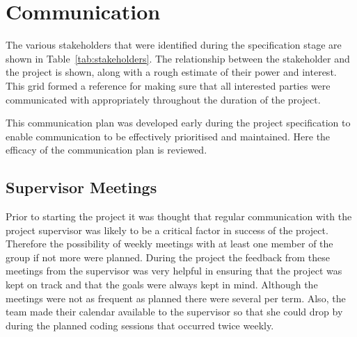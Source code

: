 \section{Communication}

The various stakeholders that were identified during the specification stage are shown in Table~\ref{tab:stakeholders}.
The relationship between the stakeholder and the project is shown, along with a rough
estimate of their power and interest.
This grid formed a reference for making sure that all interested parties were communicated
with appropriately throughout the duration of the project.

This communication plan was developed early during the project specification to enable communication to be effectively prioritised and maintained. Here the efficacy of the communication plan is reviewed.

\subsection{Supervisor Meetings}
Prior to starting the project it was thought that regular communication with the project
supervisor was likely to be a critical factor in success of the project. Therefore the
possibility of weekly meetings with at least one member of the group if not more were
planned. During the project the feedback from these meetings from the supervisor was very
helpful in ensuring that the project was kept on track and that the goals were always
kept in mind. Although the meetings were not as frequent as planned there were several
per term. Also, the team made their calendar available to the supervisor so that she
could drop by during the planned coding sessions that occurred twice weekly.

